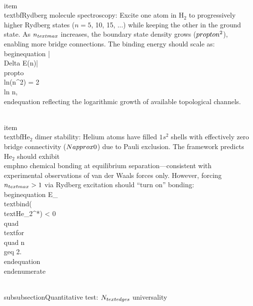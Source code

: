 \documentclass[aps,prd,twocolumn,superscriptaddress,groupedaddress,showpacs]{revtex4-2}
\begin{document}
\\item \\textbf{Rydberg molecule spectroscopy}: Excite one atom in H$_2$ to progressively higher Rydberg states ($n=5$, 10, 15, ...) while keeping the other in the ground state. As $n_{\\text{max}}$ increases, the boundary state density grows ($\\propto n^2$), enabling more bridge connections. The binding energy should scale as:
\\begin{equation}
|\\Delta E(n)| \\propto \\ln(n^2) = 2\\ln n,
\\end{equation}
reflecting the logarithmic growth of available topological channels.

\\item \\textbf{He$_2$ dimer stability}: Helium atoms have filled $1s^2$ shells with effectively zero bridge connectivity ($N \\approx 0$) due to Pauli exclusion. The framework predicts He$_2$ should exhibit \\emph{no} chemical bonding at equilibrium separation---consistent with experimental observations of van der Waals forces only. However, forcing $n_{\\text{max}} > 1$ via Rydberg excitation should ``turn on'' bonding:
\\begin{equation}
E_{\\text{bind}}(\\text{He}_2^*) < 0 \\quad \\text{for} \\quad n \\geq 2.
\\end{equation}
\\end{enumerate}

\\subsubsection{Quantitative test: $N_{\\text{edges}}$ universality}
\end{document}
